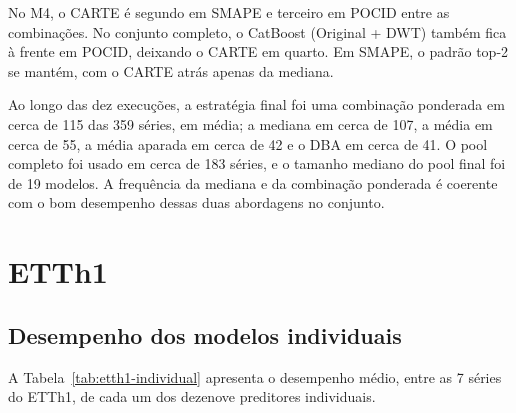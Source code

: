 No M4, o CARTE é segundo em SMAPE e terceiro em POCID entre as combinações. No conjunto completo, o CatBoost (Original + DWT) também fica à frente em POCID, deixando o CARTE em quarto. Em SMAPE, o padrão top-2 se mantém, com o CARTE atrás apenas da mediana.

Ao longo das dez execuções, a estratégia final foi uma combinação ponderada em cerca de 115 das 359 séries, em média; a mediana em cerca de 107, a média em cerca de 55, a média aparada em cerca de 42 e o DBA em cerca de 41. O pool completo foi usado em cerca de 183 séries, e o tamanho mediano do pool final foi de 19 modelos. A frequência da mediana e da combinação ponderada é coerente com o bom desempenho dessas duas abordagens no conjunto.
\section{ETTh1} \label{sec:resultados-etth1}

\subsection{Desempenho dos modelos individuais}

A Tabela~\ref{tab:etth1-individual} apresenta o desempenho médio, entre as 7 séries do ETTh1, de cada um dos dezenove preditores individuais.

